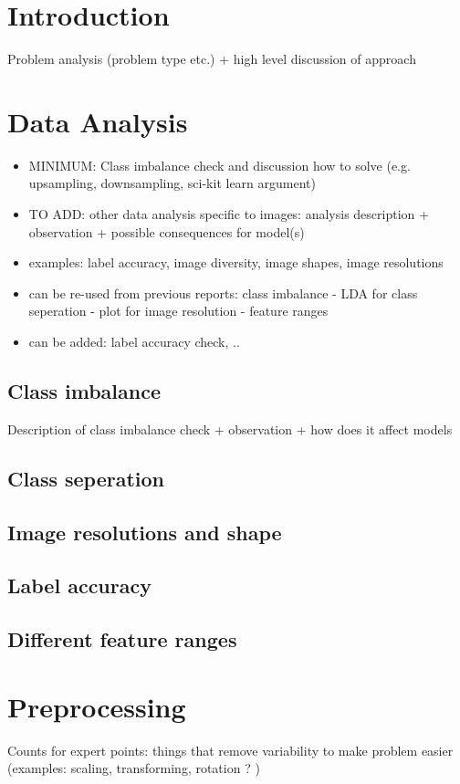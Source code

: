 \documentclass[8pt, a4]{article}
\begin{document}
	
	\section{Introduction}
	Problem analysis (problem type etc.) + high level discussion of approach 

	\section{Data Analysis}
	\begin{itemize}
		\item MINIMUM: Class imbalance check and discussion how to solve (e.g. upsampling, downsampling, sci-kit learn argument)
		\item TO ADD: other data analysis specific to images: analysis description + observation + possible consequences for model(s)
		\item examples: label accuracy, image diversity, image shapes, image resolutions 
		\item can be re-used from previous reports: class imbalance - LDA for class seperation - plot for image resolution - feature ranges
		\item can be added: label accuracy check, .. 
	\end{itemize}

	\subsection{Class imbalance}
	Description of class imbalance check + observation + how does it affect models
	\subsection{Class seperation}
	\subsection{Image resolutions and shape}
	\subsection{Label accuracy}
	\subsection{Different feature ranges}	
	\section{Preprocessing}
 	Counts for expert points: things that remove variability to make problem easier (examples: scaling, transforming, rotation ? )
	
\end{document}
